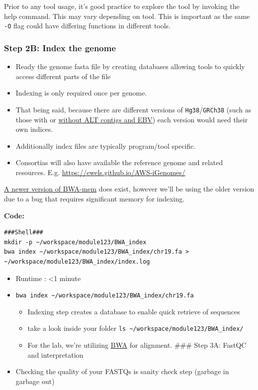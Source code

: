 \documentclass[
]{book}
\providecommand{\tightlist}{%
  \setlength{\itemsep}{0pt}\setlength{\parskip}{0pt}}
\begin{document}
Prior to any tool usage, it's good practice to explore the tool by invoking the help command. This may vary depending on tool. This is important as the same \texttt{-O} flag could have differing functions in different tools.

\subsubsection{Step 2B: Index the genome}\label{step-2b-index-the-genome}

\begin{itemize}
\tightlist
\item
  Ready the genome fasta file by creating databases allowing tools to quickly access different parts of the file
\item
  Indexing is only required once per genome.
\item
  That being said, because there are different versions of \texttt{Hg38}/\texttt{GRCh38} (such as those with or \href{https://gatk.broadinstitute.org/hc/en-us/articles/360035890951-Human-genome-reference-builds-GRCh38-or-hg38-b37-hg19}{without ALT contigs and EBV}) each version would need their own indices.
\item
  Additionally index files are typically program/tool specific.
\item
  Consortias will also have available the reference genome and related resources. E.g. \url{https://ewels.github.io/AWS-iGenomes/}
\end{itemize}

\href{https://github.com/bwa-mem2/bwa-mem2}{A newer version of BWA-mem} does exist, however we'll be using the older version due to a bug that requires significant memory for indexing.

\textbf{Code:}

\begin{verbatim}
###Shell###
mkdir -p ~/workspace/module123/BWA_index
bwa index ~/workspace/module123/BWA_index/chr19.fa > ~/workspace/module123/BWA_index/index.log
\end{verbatim}

\begin{itemize}
\tightlist
\item
  Runtime : \textless1 minute
\item
  \texttt{bwa\ index\ \textasciitilde{}/workspace/module123/BWA\_index/chr19.fa}

  \begin{itemize}
  \tightlist
  \item
    Indexing step creates a database to enable quick retrieve of sequences
  \item
    take a look inside your folder \texttt{ls\ \textasciitilde{}/workspace/module123/BWA\_index/}
  \item
    For the lab, we're utilizing \href{https://bio-bwa.sourceforge.net/bwa.shtml}{BWA} for alignment.
    \#\#\# Step 3A: FastQC and interpretation
  \end{itemize}
\item
  Checking the quality of your FASTQs is sanity check step (garbage in garbage out)
\end{itemize}
\end{document}
